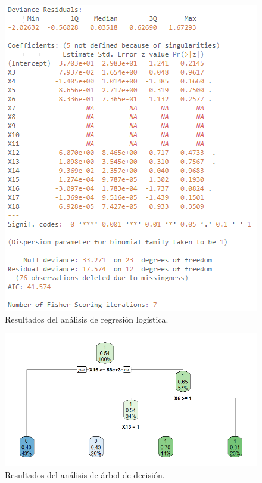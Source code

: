 \begin{figure}
    \centering
    \includegraphics[scale=1]{figuras/Capture4.PNG}
    \caption{Resultados del análisis de regresión logística.}
    \label{fig:my_label}
\end{figure}

\begin{figure}
    \centering
    \includegraphics[scale=0.75]{figuras/Rplot1.png}
    \caption{Resultados del análisis de árbol de decisión.}
    \label{fig:my_label}
\end{figure}

